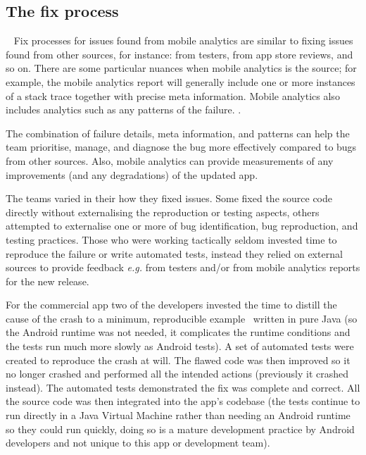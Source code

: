 \subsection{The fix process}~\label{aiu-the-fix-process-topic}
Fix processes for issues found from mobile analytics are similar to fixing issues found from other sources, for instance: from testers, from app store reviews, and so on. There are some particular nuances when mobile analytics is the source; for example, the mobile analytics report will generally include one or more instances of a stack trace together with precise meta information. Mobile analytics also includes analytics such as any patterns of the failure. . 

The combination of failure details, meta information, and patterns can help the team prioritise, manage, and diagnose the bug more effectively compared to bugs from other sources. Also, mobile analytics can provide measurements of any improvements (and any degradations) of the updated app.

The teams varied in their how they fixed issues. Some fixed the source code directly without externalising the reproduction or testing aspects, others attempted to externalise one or more of bug identification, bug reproduction, and testing practices. Those who were working tactically seldom invested time to reproduce the failure or write automated tests, instead they relied on external sources to provide feedback \emph{e.g.} from testers and/or from mobile analytics reports for the new release.  

For the commercial app two of the developers invested the time to distill the cause of the crash to a minimum, reproducible example~ written in pure Java (so the Android runtime was not needed, it complicates the runtime conditions and the tests run much more slowly as Android tests). A set of automated tests were created to reproduce the crash at will. The flawed code was then improved so it no longer crashed and performed all the intended actions (previously it crashed instead). The automated tests demonstrated the fix was complete and correct. All the source code was then integrated into the app's codebase (the tests continue to run directly in a Java Virtual Machine rather than needing an Android runtime so they could run quickly, doing so is a mature development practice by Android developers and not unique to this app or development team).


